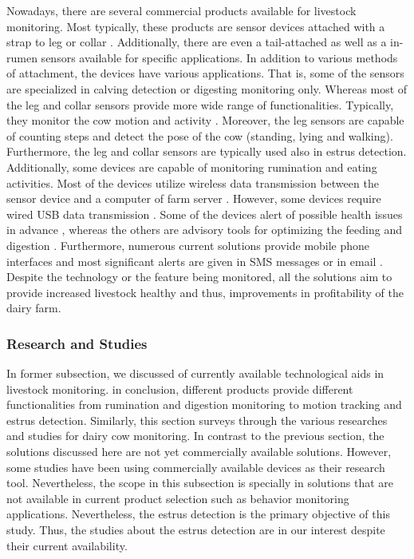 \documentclass[english,12pt,a4paper,pdftex,elec,utf8]{aaltothesis}
\begin{document}
Nowadays, there are several commercial products available for livestock monitoring. Most typically, these products are sensor devices attached with a strap to leg \cite{iceroboticproductbrochure}\cite{geacowscout} or collar \cite{heatime}\cite{geacowscout}\cite{moocall}. Additionally, there are even a tail-attached \cite{moocall} as well as a in-rumen \cite{wellcowbolus} sensors available for specific applications. In addition to various methods of attachment, the devices have various applications. That is, some of the sensors are specialized in calving detection \cite{moocall} or digesting monitoring \cite{wellcowbolus} only. Whereas most of the leg and collar sensors provide more wide range of functionalities. Typically, they monitor the cow motion and activity \cite{iceroboticproductbrochure}\cite{heatime}\cite{geacowscout,}\cite{moocall}. Moreover, the leg sensors are capable of counting steps and detect the pose of the cow (standing, lying and walking). Furthermore, the leg and collar sensors are typically used also in estrus detection. Additionally, some devices are capable of monitoring rumination \cite{heatime} and eating \cite{geacowscout} activities. Most of the devices utilize wireless data transmission between the sensor device and a computer of farm server \cite{heatime} \cite{geacowscout} \cite{iceroboticproductbrochure} \cite{wellcowbolus}. However, some devices require wired USB data transmission \cite{iceroboticproductbrochure}. Some of the devices alert of possible health issues in advance \cite{heatime}\cite{geacowscout}\cite{iceroboticproductbrochure}, whereas the others are advisory tools for optimizing the feeding and digestion \cite{wellcowbolus}. Furthermore, numerous current solutions provide mobile phone interfaces and most significant alerts are given in SMS messages or in email \cite{heatime}. Despite the technology or the feature being monitored, all the solutions aim to provide increased livestock healthy and thus, improvements in profitability of the dairy farm.


\subsubsection{Research and Studies} \label{researchandstudiessection}

In former subsection, we discussed of currently available technological aids in livestock monitoring. in conclusion, different products provide different functionalities from rumination and digestion monitoring to motion tracking and estrus detection. Similarly, this section surveys through the various researches and studies for dairy cow monitoring. In contrast to the previous section, the solutions discussed here are not yet commercially available solutions. However, some studies have been using commercially available devices as their research tool. Nevertheless, the scope in this subsection is specially in solutions that are not available in current product selection such as behavior monitoring applications. Nevertheless, the estrus detection is the primary objective of this study. Thus, the studies about the estrus detection are in our interest despite their current availability. 
\end{document}
